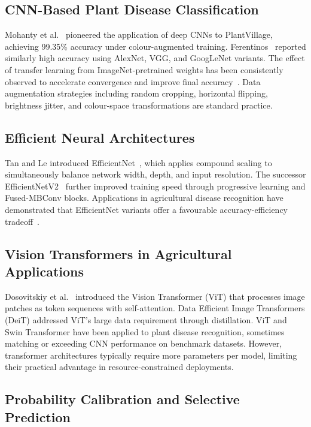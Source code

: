 \documentclass[conference]{IEEEtran}
\begin{document}
\subsection{CNN-Based Plant Disease Classification}

Mohanty et al.~\cite{mohanty2016deep} pioneered the application of
deep CNNs to PlantVillage, achieving 99.35\% accuracy under
colour-augmented training.
Ferentinos~\cite{ferentinos2018deep} reported similarly high accuracy
using AlexNet, VGG, and GoogLeNet variants. The effect of transfer
learning from ImageNet-pretrained weights has been consistently
observed to accelerate convergence and improve final
accuracy~\cite{too2019comparative,kamilaris2018deep}.
Data augmentation strategies including random cropping, horizontal
flipping, brightness jitter, and colour-space transformations are
standard
practice.

\subsection{Efficient Neural Architectures}

Tan and Le introduced EfficientNet~\cite{tan2019efficientnet}, which
applies compound scaling to simultaneously balance network width,
depth, and input resolution. The successor
EfficientNetV2~\cite{tan2021efficientnetv2} further improved training
speed through progressive learning and Fused-MBConv blocks.
Applications in agricultural disease recognition have demonstrated
that EfficientNet variants offer a favourable accuracy-efficiency
tradeoff~\cite{atila2021plant}.

\subsection{Vision Transformers in Agricultural Applications}

Dosovitskiy et al.~\cite{dosovitskiy2021image} introduced the Vision
Transformer (ViT) that processes image patches as token sequences with
self-attention. Data Efficient Image Transformers
(DeiT) addressed ViT's large data
requirement through distillation. ViT and Swin
Transformer have been applied to plant disease
recognition, sometimes matching or exceeding CNN performance on
benchmark
datasets. However,
transformer architectures typically require more parameters per model,
limiting their practical advantage in resource-constrained deployments.

\subsection{Probability Calibration and Selective Prediction}
\end{document}

